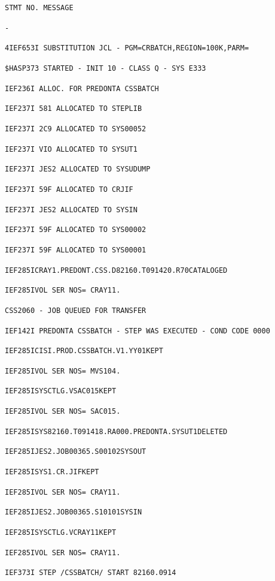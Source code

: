 
\texttt{STMT NO. MESSAGE}

\texttt{-}

\texttt{4\quad IEF653I SUBSTITUTION JCL - PGM=CRBATCH,REGION=100K,PARM=}

\texttt{\$HASP373 STARTED - INIT 10 - CLASS Q - SYS E333}

\texttt{IEF236I ALLOC. FOR PREDONTA CSSBATCH}

\texttt{IEF237I 581 ALLOCATED TO STEPLIB}

\texttt{IEF237I 2C9 ALLOCATED TO SYS00052}

\texttt{IEF237I VIO ALLOCATED TO SYSUT1}

\texttt{IEF237I JES2 ALLOCATED TO SYSUDUMP}

\texttt{IEF237I 59F ALLOCATED TO CRJIF}

\texttt{IEF237I JES2 ALLOCATED TO SYSIN}

\texttt{IEF237I 59F ALLOCATED TO SYS00002}

\texttt{IEF237I 59F ALLOCATED TO SYS00001}

\texttt{IEF285I\quad CRAY1.PREDONT.CSS.D82160.T091420.R70\quad CATALOGED}

\texttt{IEF285I\quad VOL SER NOS= CRAY11.}

\texttt{CSS2060 - JOB QUEUED FOR TRANSFER}

\texttt{IEF142I PREDONTA CSSBATCH - STEP WAS EXECUTED - COND CODE 0000}

\texttt{IEF285I\quad CISI.PROD.CSSBATCH.V1.YY01\quad KEPT}

\texttt{IEF285I\quad VOL SER NOS= MVS104.}

\texttt{IEF285I\quad SYSCTLG.VSAC015\quad KEPT}

\texttt{IEF285I\quad VOL SER NOS= SAC015.}

\texttt{IEF285I\quad SYS82160.T091418.RA000.PREDONTA.SYSUT1\quad DELETED}

\texttt{IEF285I\quad JES2.JOB00365.S00102\quad SYSOUT}

\texttt{IEF285I\quad SYS1.CR.JIF\quad KEPT}

\texttt{IEF285I\quad VOL SER NOS= CRAY11.}

\texttt{IEF285I\quad JES2.JOB00365.S10101\quad SYSIN}

\texttt{IEF285I\quad SYSCTLG.VCRAY11\quad KEPT}

\texttt{IEF285I\quad VOL SER NOS= CRAY11.}

\texttt{IEF373I STEP /CSSBATCH/ START 82160.0914}

